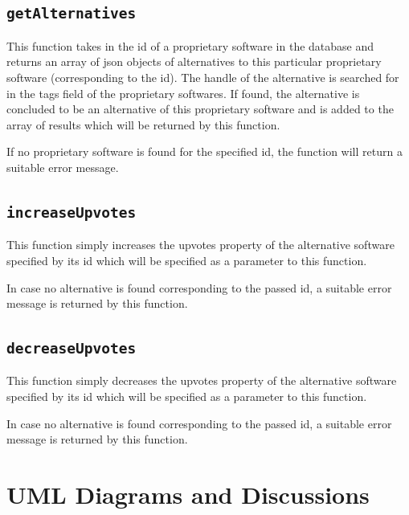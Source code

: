 \subsection{\texttt{getAlternatives}}
This function takes in the id of a proprietary software in the database and returns an array of json objects of alternatives to this particular proprietary software (corresponding to the id). The handle of the alternative is searched for in the tags field of the proprietary softwares. If found, the alternative is concluded to be an alternative of this proprietary software and is added to the array of results which will be returned by this function.

If no proprietary software is found for the specified id, the function will return a suitable error message.

\subsection{\texttt{increaseUpvotes}}
This function simply increases the upvotes property of the alternative software specified by its id which will be specified as a parameter to this function.

In case no alternative is found corresponding to the passed id, a suitable error message is returned by this function.

\subsection{\texttt{decreaseUpvotes}}
This function simply decreases the upvotes property of the alternative software specified by its id which will be specified as a parameter to this function.

In case no alternative is found corresponding to the passed id, a suitable error message is returned by this function.


\section{UML Diagrams and Discussions}

